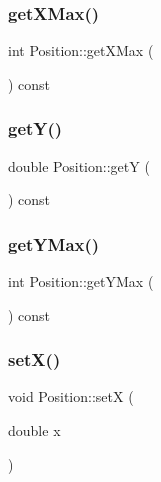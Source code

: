 \mbox{\label{class_position_abc0b7856e25fab037f1dbfb543ec96cf}} 
\subsubsection{\texorpdfstring{get\+X\+Max()}{getXMax()}}
{\footnotesize\ttfamily int Position\+::get\+X\+Max (\begin{DoxyParamCaption}{ }\end{DoxyParamCaption}) const}

\mbox{\label{class_position_a83ae4a9db1a4f29e5a43e5592b65f095}} 
\subsubsection{\texorpdfstring{get\+Y()}{getY()}}
{\footnotesize\ttfamily double Position\+::getY (\begin{DoxyParamCaption}{ }\end{DoxyParamCaption}) const}

\mbox{\label{class_position_a6796150fb51e6d8760a5d025b09d1ca5}} 
\subsubsection{\texorpdfstring{get\+Y\+Max()}{getYMax()}}
{\footnotesize\ttfamily int Position\+::get\+Y\+Max (\begin{DoxyParamCaption}{ }\end{DoxyParamCaption}) const}

\mbox{\label{class_position_af12bdfae6a9ccecfc31d968de3613a1d}} 
\subsubsection{\texorpdfstring{set\+X()}{setX()}}
{\footnotesize\ttfamily void Position\+::setX (\begin{DoxyParamCaption}\item[{double}]{x }\end{DoxyParamCaption})}

